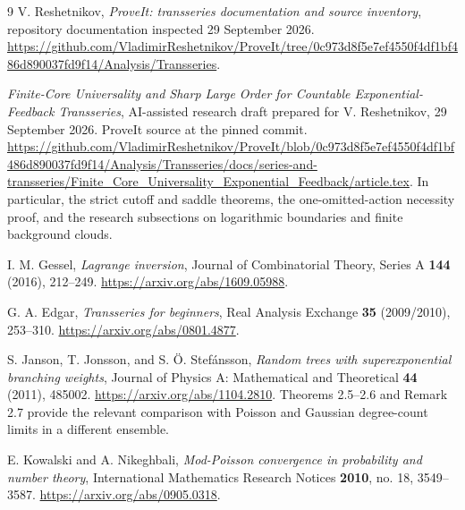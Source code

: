 \documentclass[11pt,a4paper]{article}
\numberwithin{equation}{section}
\theoremstyle{definition}
\theoremstyle{remark}
\begin{document}
\begingroup\small
\begin{thebibliography}{9}
\setlength{\itemsep}{3pt}\setlength{\parskip}{0pt}
V. Reshetnikov, \emph{ProveIt: transseries documentation and source inventory},
repository documentation inspected 29 September 2026.
\url{https://github.com/VladimirReshetnikov/ProveIt/tree/0c973d8f5e7ef4550f4df1bf486d890037fd9f14/Analysis/Transseries}.

\emph{Finite-Core Universality and Sharp Large Order for Countable
Exponential-Feedback Transseries}, AI-assisted research draft prepared for
V. Reshetnikov, 29 September 2026. ProveIt source at the pinned commit.
\url{https://github.com/VladimirReshetnikov/ProveIt/blob/0c973d8f5e7ef4550f4df1bf486d890037fd9f14/Analysis/Transseries/docs/series-and-transseries/Finite_Core_Universality_Exponential_Feedback/article.tex}.
In particular, the strict cutoff and saddle theorems, the one-omitted-action
necessity proof, and the research subsections on logarithmic boundaries and
finite background clouds.

I. M. Gessel, \emph{Lagrange inversion}, Journal of Combinatorial Theory,
Series A \textbf{144} (2016), 212--249.
\url{https://arxiv.org/abs/1609.05988}.

G. A. Edgar, \emph{Transseries for beginners}, Real Analysis Exchange
\textbf{35} (2009/2010), 253--310.
\url{https://arxiv.org/abs/0801.4877}.

S. Janson, T. Jonsson, and S. \"O. Stef\'ansson,
\emph{Random trees with superexponential branching weights},
Journal of Physics A: Mathematical and Theoretical \textbf{44} (2011), 485002.
\url{https://arxiv.org/abs/1104.2810}.
Theorems 2.5--2.6 and Remark 2.7 provide the relevant comparison with
Poisson and Gaussian degree-count limits in a different ensemble.

E. Kowalski and A. Nikeghbali, \emph{Mod-Poisson convergence in probability
and number theory}, International Mathematics Research Notices
\textbf{2010}, no. 18, 3549--3587.
\url{https://arxiv.org/abs/0905.0318}.
\end{thebibliography}
\endgroup
\end{document}
